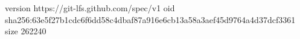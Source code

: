 version https://git-lfs.github.com/spec/v1
oid sha256:63e5f27b1cdc6f6dd58c4dbaf87a916e6cb13a58a3aef45d9764a4d37dcf3361
size 262240
